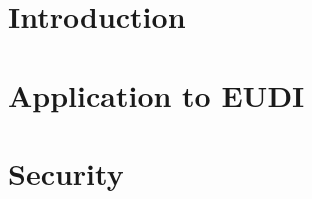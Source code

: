 \documentclass{iacrtrans}
\newcommand{\jbel}[1]{{\color{blue}{}jbel: #1}}
\begin{document}


\section{Introduction}
\label{sec:introduction}
%


\section{Application to EUDI}
\label{sec:appeudi}




\section{Security}
\label{sec:security}
\end{document}
